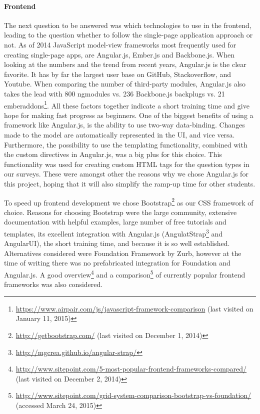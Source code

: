	\paragraph{Frontend}

		The next question to be answered was which technologies to use in the frontend, leading to the question whether to follow the single-page application approach or not. As of 2014 JavaScript model-view frameworks most frequently used for creating single-page apps, are Angular.js, Ember.js and Backbone.js. When looking at the numbers and the trend from recent years, Angular.js is the clear favorite. It has by far the largest user base on GitHub, Stackoverflow, and Youtube. When comparing the number of third-party modules, Angular.js also takes the lead with 800 ngmodules vs. 236 Backbone.js backplugs vs. 21 emberaddons\footnote{\url{https://www.airpair.com/js/javascript-framework-comparison} (last visited on January 11, 2015)}. All these factors together indicate a short training time and give hope for making fast progress as beginners. 
		One of the biggest benefits of using a framework like Angular.js, is the ability to use two-way data-binding. Changes made to the model are automatically represented in the UI, and vice versa. Furthermore, the possibility to use the templating functionality, combined with the custom directives in Angular.js, was a big plus for this choice. This functionality was used for creating custom HTML tags for the question types in our surveys. These were amongst other the reasons why we chose Angular.js for this project, hoping that it will also simplify the ramp-up time for other students.

		To speed up frontend development we chose Bootstrap\footnote{\url{http://getbootstrap.com/} (last visited on December 1, 2014)} as our CSS framework of choice. Reasons for choosing Bootstrap were the large community, extensive documentation with helpful examples, large number of free tutorials and templates, its excellent integration with Angular.js (AngulatStrap\footnote{\url{http://mgcrea.github.io/angular-strap/}} and AngularUI), the short training time, and because it is so well established.
		Alternatives considered were Foundation Framework by Zurb, however at the time of writing there was no prefabricated integration for Foundation and Angular.js.
		A good overview\footnote{\url{http://www.sitepoint.com/5-most-popular-frontend-frameworks-compared/} (last visited on December 2, 2014)} and a comparison\footnote{\url{http://www.sitepoint.com/grid-system-comparison-bootstrap-vs-foundation/} (accessed March 24, 2015)} of currently popular frontend frameworks was also considered.
	

